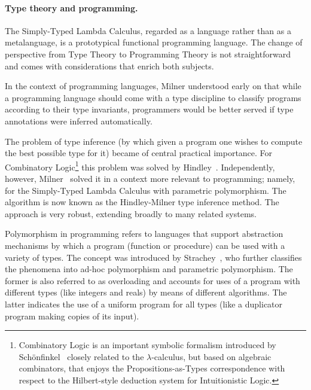 \documentclass[11pt,twocolumn]{article}
\newcommand{\lcalculus}{\mbox{$\lambda$-calculus}}
\begin{document}
\paragraph{Type theory and programming.}

The Simply-Typed Lambda Calculus, regarded as a language rather than as a
metalanguage, is a prototypical functional programming language.  The change
of perspective from Type Theory to Programming Theory is not straightforward
and comes with considerations that enrich both subjects.  

In the context of programming languages, Milner %
understood early on that while a programming language should come with a
type discipline to classify programs according to their type invariants,
programmers would be better served if type annotations were inferred
automatically.  

The problem of type inference (by which given a program one wishes to compute
the best possible type for it) became of central practical importance.  For
Combinatory Logic\footnote{Combinatory Logic is an important symbolic
  formalism introduced by Sch\"onfinkel~\cite{Schonfinkel} closely related
  to the {\lcalculus}, but based on algebraic combinators, that enjoys the
  Propositions-as-Types correspondence with respect to the Hilbert-style
  deduction system for Intuitionistic %
  Logic.} 
this problem was solved by Hindley~\cite{Hindley1969}.  Independently,
however, Milner~\cite{Milner1978} solved it in a context more relevant to
programming; namely, for the Simply-Typed Lambda Calculus with parametric
polymorphism.  The algorithm is now known as the Hindley-Milner type
inference method.  The approach is very robust, extending broadly to
many related systems.
 
Polymorphism in programming refers to languages that support abstraction
mechanisms by which a program (function or procedure) can be used with a
variety of types.  The concept was introduced by Strachey~\cite{Strachey1967},
who further classifies the phenomena into ad-hoc polymorphism and parametric polymorphism.
The former is also referred to as overloading and accounts for uses of a
program with different types (like integers and reals) by means of different
algorithms.  The latter indicates the use of a uniform program for all types
(like a duplicator program making copies of its input).
\end{document}
